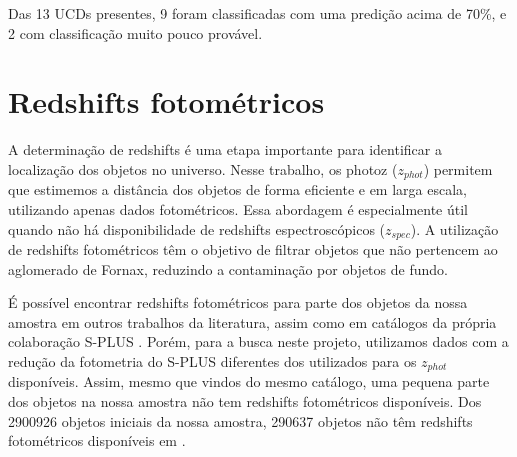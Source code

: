 Das 13 UCDs presentes, 9 foram classificadas com uma predição acima de 70\%, e 2 com classificação muito pouco provável. 





\section{Redshifts fotométricos}\label{sec:zphot}

A determinação de redshifts é uma etapa importante para identificar a localização dos objetos no universo. Nesse trabalho, os \ac{photoz} (\textit{$z_{phot}$}) permitem que estimemos a distância dos objetos de forma eficiente e em larga escala, utilizando apenas dados fotométricos. Essa abordagem é especialmente útil quando não há disponibilidade de redshifts espectroscópicos (\textit{$z_{spec}$}). A utilização de redshifts fotométricos têm o objetivo de filtrar objetos que não pertencem ao aglomerado de Fornax, reduzindo a contaminação por objetos de fundo.

É possível encontrar redshifts fotométricos para parte dos objetos da nossa amostra em outros trabalhos da literatura, assim como em catálogos da própria colaboração S-PLUS \citep{erik_photoz_2024}. Porém, para a busca neste projeto, utilizamos dados com a redução da fotometria do S-PLUS diferentes dos utilizados para os \textit{$z_{phot}$} disponíveis. Assim, mesmo que vindos do mesmo catálogo, uma pequena parte dos objetos na nossa amostra não tem redshifts fotométricos disponíveis. Dos 2900926 objetos iniciais da nossa amostra, 290637 objetos não têm redshifts fotométricos disponíveis em \citep{erik_photoz_2024}.

